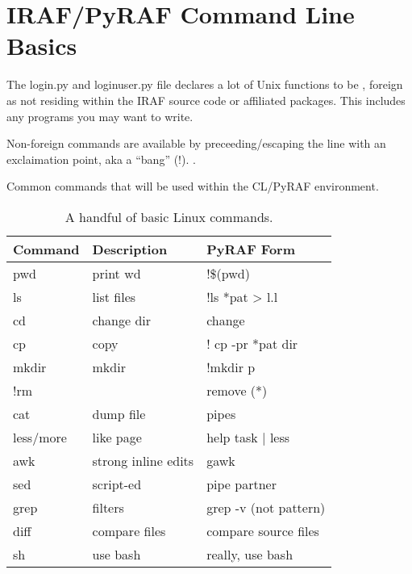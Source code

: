 
\section{IRAF/PyRAF Command Line Basics}

The login.py and loginuser.py file declares a lot of Unix functions
to be  , foreign as not residing
within the IRAF source code or affiliated packages. This includes any
programs you may want to write. 

Non-foreign commands are available by preceeding/escaping the
line with an exclaimation point, aka a ``bang'' (!). .

Common commands that will be used within the CL/PyRAF environment.

\begin{table}[h!]
\centering
\begin{tabular}{| l | l | l |}
\hline
Command  & Description   & PyRAF Form   \\
\hline
pwd       & print wd            & !\$(pwd)    \\ 
ls        & list files          & !ls *pat > l.l    \\ 
cd        & change dir          & change     \\ 
cp        & copy                & ! cp -pr *pat dir    \\ 
mkdir     & mkdir               & !mkdir p     \\ 
!rm       &                     & remove (*)    \\ 
cat       & dump file           & pipes    \\ 
less/more & like page           & help task  | less    \\ 
awk       & strong inline edits & gawk    \\ 
sed       & script-ed           & pipe partner    \\ 
grep      & filters             & grep -v (not pattern)    \\ 
diff      & compare files       & compare source files    \\ 
sh        & use bash            & really, use bash    \\ 
\hline
\end{tabular}
\caption[Basic Linux Commands]{A handful of basic Linux commands.}
\label{table:BasicCommands}
\end{table}


